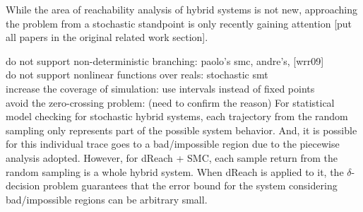 \documentclass[runningheads,a4paper]{llncs}
\begin{document}
While the area of reachability analysis of hybrid systems is not new, approaching the problem from a stochastic standpoint is only recently gaining attention [put all papers in the original related work section].

do not support non-deterministic branching: paolo's smc, andre's, [wrr09]\\
do not support nonlinear functions over reals: stochastic smt\\
increase the coverage of simulation: use intervals instead of fixed points\\
avoid the zero-crossing problem: (need to confirm the reason) For statistical model checking for stochastic hybrid systems, each trajectory from the random sampling only represents part of the possible system behavior. And, it is possible for this individual trace goes to a bad/impossible region due to the piecewise analysis adopted. However, for dReach + SMC, each sample return from the random sampling is a whole hybrid system. When dReach is applied to it, the $\delta$-decision problem guarantees that the error bound for the system considering bad/impossible regions can be arbitrary small. 
 
\end{document}
